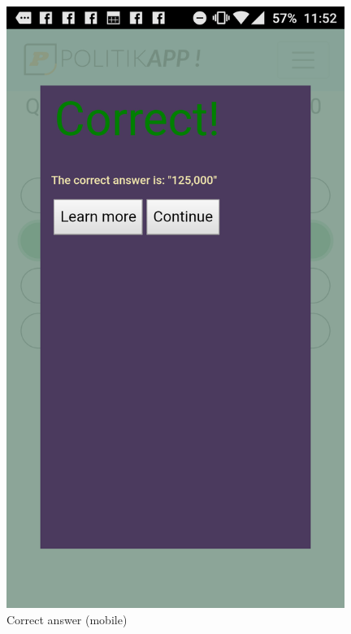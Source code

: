 \documentclass[paper=a4,fontsize=11pt]{article}
\begin{document}
\begin{figure}[H]
  \caption{Correct answer (mobile)}
	\hfill\includegraphics[width=11cm]{Walkthrough/Mobile_correct.PNG}\hspace*{\fill}
\end{figure}
\end{document}
